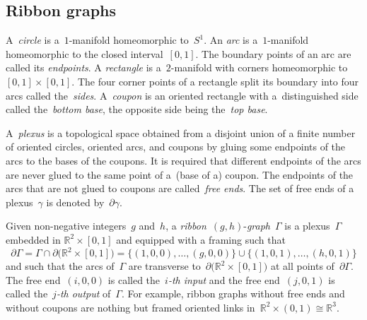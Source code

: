 \documentclass[pdftex]{sigma}
\numberwithin{equation}{section}
\newcommand{\R}{\mathbb{R}}
\begin{document}
\subsection{Ribbon graphs} \label{ribbongrph}
A~\emph{circle} is a~$1$-manifold homeomorphic to~$S^1$. An \emph{arc} is a~$1$-manifold homeomorphic to the closed interval~$[0,1]$.
The boundary points of an arc are called its \emph{endpoints}.
A \emph{rectangle} is a~$2$-manifold with corners homeomorphic to~$[0,1] \times [0,1]$. The four corner points of a rectangle split its boundary into four arcs called the~\emph{sides}. A~\emph{coupon} is an oriented rectangle with a~distinguished side called the~\emph{bottom base}, the opposite side being the~\emph{top base}.

A~\emph{plexus} is a topological space obtained from a disjoint
union of a finite number of oriented circles, oriented arcs, and coupons
by gluing some endpoints of the arcs to the bases of the coupons. It is required that different endpoints of the arcs are never glued to the same point of a~(base of a) coupon. The endpoints of the arcs that are not glued to coupons are called~\emph{free ends}. The set of free ends of a plexus~$\gamma$ is denoted by~$\partial \gamma$.

Given non-negative integers~$g$ and~$h$, a \textit{ribbon}~$(g,h)$-\textit{graph}~$\Gamma$ is a plexus~$\Gamma$ embedded in ${\R^2 \times [0,1]}$ and equipped with a framing such that
\[
\partial \Gamma=\Gamma\cap \partial \bigl(\R^2 \times [0,1]\bigr) =\{(1,0,0), \dots, (g,0,0)\} \cup \{(1,0,1), \dots, (h,0,1)\}
\]
and such that the arcs of~$\Gamma$ are transverse to~$\partial \bigl(\R^2 \times [0,1]\bigr)$ at all points of~$ \partial \Gamma$.
The free end~$(i,0,0)$ is called the~\emph{$i$-th input} and the free end~$(j,0,1)$ is called the~\emph{$j$-th output} of~$\Gamma$.
For example, ribbon graphs without free ends and without coupons are nothing but framed oriented links in~$\R^2 \times (0,1) \cong \R^3$.
\end{document}

